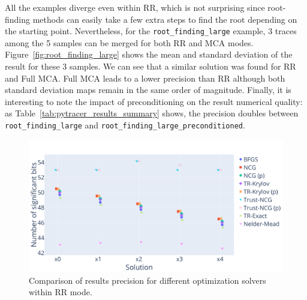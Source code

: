 \documentclass[10pt,journal,compsoc]{IEEEtran}
\begin{document}

All the examples diverge even within RR, which is not surprising since
root-finding methods can easily take a few extra steps to find the root
depending on the starting point. Nevertheless, for the
\texttt{root\_finding\_large} example, 3 traces among the 5 samples can be
merged for both RR and MCA modes. Figure~\ref{fig:root_finding_large} shows the
mean and standard deviation of the result for these 3 samples. We can see that a
similar solution was found for RR and Full MCA. Full MCA leads to a lower
precision than RR although both standard deviation maps remain in the same order
of magnitude. Finally, it is interesting to note the impact of preconditioning
on the result numerical quality: as Table~\ref{tab:pytracer_results_summary}
shows, the precision doubles between \texttt{root\_finding\_large} and
\texttt{root\_finding\_large\_preconditioned}.

\begin{figure}
    \centering
    \includegraphics[width=\linewidth]{figure/unconstrained_optimization_comparison.pdf}
    \caption{Comparison of results precision for different optimization solvers within RR mode.}
    \label{fig:unconstrained_optimization}
\end{figure}
\end{document}
